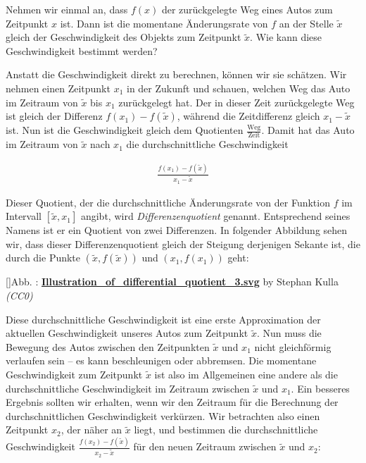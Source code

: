 \documentclass[fontsize=9pt,
               parskip=half-,
               DIV=14,
               listof=chapterentry,
               tocflat]{scrbook}
\newcounter{imagelabel}
\begin{document}
Nehmen wir einmal an, dass $f(x)$ der zurückgelegte Weg eines Autos zum Zeitpunkt $x$ ist. Dann ist die momentane Änderungsrate von $f$ an der Stelle ${\tilde {x}}$ gleich der Geschwindigkeit des Objekts zum Zeitpunkt ${\tilde {x}}$. Wie kann diese Geschwindigkeit bestimmt werden?

Anstatt die Geschwindigkeit direkt zu berechnen, können wir sie schätzen. Wir nehmen einen Zeitpunkt $x_{1}$ in der Zukunft und schauen, welchen Weg das Auto im Zeitraum von ${\tilde {x}}$ bis $x_{1}$ zurückgelegt hat. Der in dieser Zeit zurückgelegte Weg ist gleich der Differenz $f(x_{1})-f({\tilde {x}})$, während die Zeitdifferenz gleich $x_{1}-{\tilde {x}}$ ist. Nun ist die Geschwindigkeit gleich dem Quotienten ${\tfrac {\text{Weg}}{\text{Zeit}}}$. Damit hat das Auto im Zeitraum von ${\tilde {x}}$ nach $x_{1}$ die durchschnittliche Geschwindigkeit

\begin{align*}
{\frac {f(x_{1})-f({\tilde {x}})}{x_{1}-{\tilde {x}}}}
\end{align*}

Dieser Quotient, der die durchschnittliche Änderungsrate von der Funktion $f$ im Intervall $[{\tilde {x}},x_{1}]$ angibt, wird \emph{Differenzenquotient} genannt. Entsprechend seines Namens ist er ein Quotient von zwei Differenzen. In folgender Abbildung sehen wir, dass dieser Differenzenquotient gleich der Steigung derjenigen Sekante ist, die durch die Punkte $({\tilde {x}},f({\tilde {x}}))$ und $(x_{1},f(x_{1}))$ geht:

[]{Abb. : \protect\href{https://commons.wikimedia.org/wiki/File:Illustration_of_differential_quotient_3.svg}{\textbf{Illustration\allowbreak\_of\allowbreak\_differential\allowbreak\_quotient\allowbreak\_3.svg}} by Stephan Kulla \textit{(CC0)}}\begin{center}
\end{center}

Diese durchschnittliche Geschwindigkeit ist eine erste Approximation der aktuellen Geschwindigkeit unseres Autos zum Zeitpunkt ${\tilde {x}}$. Nun muss die Bewegung des Autos zwischen den Zeitpunkten ${\tilde {x}}$ und $x_{1}$ nicht gleichförmig verlaufen sein – es kann beschleunigen oder abbremsen. Die momentane Geschwindigkeit zum Zeitpunkt ${\tilde {x}}$ ist also im Allgemeinen eine andere als die durchschnittliche Geschwindigkeit im Zeitraum zwischen ${\tilde {x}}$ und $x_{1}$. Ein besseres Ergebnis sollten wir erhalten, wenn wir den Zeitraum für die Berechnung der durchschnittlichen Geschwindigkeit verkürzen. Wir betrachten also einen Zeitpunkt $x_{2}$, der näher an ${\tilde {x}}$ liegt, und bestimmen die durchschnittliche Geschwindigkeit ${\tfrac {f(x_{2})-f({\tilde {x}})}{x_{2}-{\tilde {x}}}}$ für den neuen Zeitraum zwischen ${\tilde {x}}$ und $x_{2}$:
\end{document}
